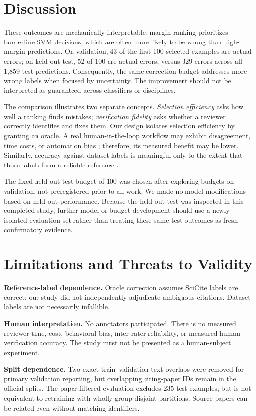 \documentclass[11pt]{article}
\begin{document}
\section{Discussion}
These outcomes are mechanically interpretable: margin ranking prioritizes borderline SVM decisions, which are often more likely to be wrong than high-margin predictions. On validation, 43 of the first 100 selected examples are actual errors; on held-out test, 52 of 100 are actual errors, versus 329 errors across all 1,859 test predictions. Consequently, the same correction budget addresses more wrong labels when focused by uncertainty. The improvement should not be interpreted as guaranteed across classifiers or disciplines.

The comparison illustrates two separate concepts. \emph{Selection efficiency} asks how well a ranking finds mistakes; \emph{verification fidelity} asks whether a reviewer correctly identifies and fixes them. Our design isolates selection efficiency by granting an oracle. A real human-in-the-loop workflow may exhibit disagreement, time costs, or automation bias \cite{chen2025human}; therefore, its measured benefit may be lower. Similarly, accuracy against dataset labels is meaningful only to the extent that those labels form a reliable reference \cite{northcutt2021confident,northcutt2021pervasive}.

The fixed held-out test budget of 100 was chosen after exploring budgets on validation, not preregistered prior to all work. We made no model modifications based on held-out performance. Because the held-out test was inspected in this completed study, further model or budget development should use a newly isolated evaluation set rather than treating these same test outcomes as fresh confirmatory evidence.

\section{Limitations and Threats to Validity}
\textbf{Reference-label dependence.} Oracle correction assumes SciCite labels are correct; our study did not independently adjudicate ambiguous citations. Dataset labels are not necessarily infallible.

\textbf{Human interpretation.} No annotators participated. There is no measured reviewer time, cost, behavioral bias, inter-rater reliability, or measured human verification accuracy. The study must not be presented as a human-subject experiment.

\textbf{Split dependence.} Two exact train--validation text overlaps were removed for primary validation reporting, but overlapping citing-paper IDs remain in the official splits. The paper-filtered evaluation excludes 235 test examples, but is not equivalent to retraining with wholly group-disjoint partitions. Source papers can be related even without matching identifiers.
\end{document}
